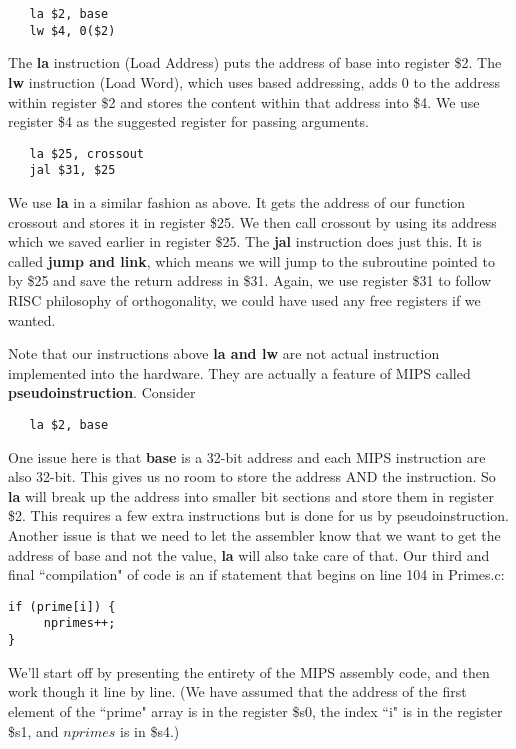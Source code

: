\documentclass[11pt]{article}
\begin{document}
\begin{verbatim}
   la $2, base
   lw $4, 0($2)
\end{verbatim}

The {\bf la} instruction (Load Address) puts the address of base into register \$2. The {\bf lw} instruction (Load Word), which uses based addressing, adds 0 to the address within register \$2 and stores the content within that address into \$4. We use register \$4 as the suggested register for passing arguments.

\begin{verbatim}
   la $25, crossout
   jal $31, $25
\end{verbatim}

We use {\bf la} in a similar fashion as above. It gets the address of our function crossout and stores it in register \$25. We then call crossout by using its address which we saved earlier in register \$25. The {\bf jal} instruction does just this. It is called {\bf jump and link}, which means we will jump to the subroutine pointed to by \$25 and save the return address in \$31. Again, we use register \$31 to follow RISC philosophy of orthogonality, we could have used any free registers if we wanted.

Note that our instructions above {\bf la and lw} are not actual instruction implemented into the hardware. They are actually a feature of MIPS called {\bf pseudoinstruction}. Consider 

\begin{verbatim}
   la $2, base
\end{verbatim}

One issue here is that {\bf base} is a 32-bit address and each MIPS instruction are also 32-bit. This gives us no room to store the address AND the instruction. So {\bf la} will break up the address into smaller bit sections and store them in register \$2. This requires a few extra instructions but is done for us by pseudoinstruction. Another issue is that we need to let the assembler know that we want to get the address of base and not the value, {\bf la} will also take care of that.
Our third and final ``compilation" of code is an if statement that begins on line 104 in Primes.c:

\begin{verbatim}
if (prime[i]) {
     nprimes++;
}
\end{verbatim}

We'll start off by presenting the entirety of the MIPS assembly code, and then work though it line by line. (We have assumed that the address of the first element of the ``prime" array is in the register \$s0, the index ``i" is in the register \$s1, and $nprimes$ is in \$s4.)
\end{document}
